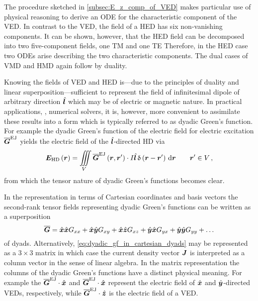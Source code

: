 The procedure sketched in \cref{subsec:E_z_comp_of_VED} makes particular use of
physical reasoning to derive an \ac{ODE} for the characteristic component of 
the \ac{VED}. 
In contrast to the \ac{VED}, the field of a \ac{HED} has six non-vanishing
components.
It can be shown, however, that the \ac{HED} field can be decomposed into two
five-component fields, one \ac{TM} and one \ac{TE}
\cite{Sommerfeld1926,Sommerfeld1964,Chew1999}
Therefore, in the \ac{HED} case two \acp{ODE} arise describing the two
characteristic components.
The dual cases of \ac{VMD} and \ac{HMD} again follow by duality.

Knowing the fields of \ac{VED} and \ac{HED} is---due to the principles of
duality and linear superposition---sufficient to represent the field of
infinitesimal dipole of arbitrary direction $\uv{l}$ which may be of electric
or magnetic nature.
In practical applications, \eg, numerical solvers, it is, however, more
convenient to assimilate these results into a form which is typically referred
to as dyadic Green's function.
For example the dyadic Green's function of the electric field for electric
excitation $\dyadicGF{EJ}$ yields the electric field of the $\uv{l}$-directed
\ac{HD} via
\begin{equation}
	\pvec{E}_\mathrm{HD} \left(\robs\right) = 
	\iiint\limits_{V}
	\dyadicGF{EJ} \left(\robs, \rsrc\right)
	\cdot
	I \uv{l} \diracDelta \left(\rdiff\right)
	\, 
	\dd \robs 
	\qquad \rsrc \in V
	\, ,
\end{equation}
from which the tensor nature of dyadic Green's functions becomes clear.

In the representation in terms of Cartesian coordinates and basis vectors the
second-rank tensor fields representing dyadic Green's functions can be written
as a superposition
\begin{equation}\label{eq:dyadic_gf_in_cartesian_dyads}
	\dyad{G} = 
	\uv{x}\uv{x} G_{xx} +
	\uv{x}\uv{y} G_{xy} +
	\uv{x}\uv{z} G_{xz} +
	\uv{y}\uv{x} G_{yx} +
	\uv{y}\uv{y} G_{yy} +
	\ldots
\end{equation}
of dyads.
Alternatively, \eqref{eq:dyadic_gf_in_cartesian_dyads} may be represented
as a $3 \times 3$ matrix in which case the current density vector $\pvec{J}$ is
interpreted as a column vector in the sense of linear algebra.
In the matrix representation the columns of the dyadic Green's functions have
a distinct physical meaning.
For example the $\dyadicGF{EJ} \cdot \uv{x}$ and $\dyadicGF{EJ} \cdot \uv{x}$
represent the electric field of $\uv{x}$ and $\uv{y}$-directed \acp{VED},
respectively, while $\dyadicGF{EJ} \cdot \uv{z}$ is the electric field of
a \ac{VED}.

